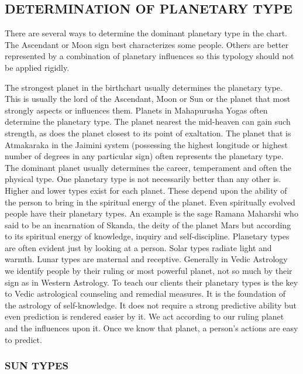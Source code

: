 \subsection{DETERMINATION OF PLANETARY TYPE }
 

There are several ways to determine the dominant planetary type in the chart. The Ascendant or Moon sign best characterizes some people. Others are better represented by a combination of planetary influences so this typology should not be applied rigidly. 

 

The strongest planet in the birthchart usually determines the planetary type. This is usually the lord of the Ascendant, Moon or Sun or the planet that most strongly aspects or influences them. 
Planets in Mahapurusha Yogas often determine the planetary type. The planet nearest the mid-heaven can gain such strength, as does the planet closest to its point of exaltation. The planet that is Atmakaraka in the Jaimini system (possessing the highest longitude or highest number of degrees in any particular sign) often represents the planetary type. The dominant planet usually determines the career, temperament and often the physical type.
One planetary type is not necessarily better than any other is. Higher and lower types exist for each planet. These depend upon the ability of the person to bring in the spiritual energy of the planet. Even spiritually evolved people have their planetary types. An example is the sage Ramana Maharshi who said to be an incarnation of Skanda, the deity of the planet Mars but according to its spiritual energy of knowledge, inquiry and self-discipline.
Planetary types are often evident just by looking at a person. Solar types radiate light and warmth. Lunar types are maternal and receptive. Generally in Vedic Astrology we identify people by their ruling or most powerful planet, not so much by their sign as in Western Astrology.
To teach our clients their planetary types is the key to Vedic astrological counseling and remedial measures. It is the foundation of the astrology of self-knowledge. It does not require a strong predictive ability but even prediction is rendered easier by it. We act according to our ruling planet and the influences upon it. Once we know that planet, a person’s actions are easy to predict.
 



\subsubsection{SUN TYPES}

